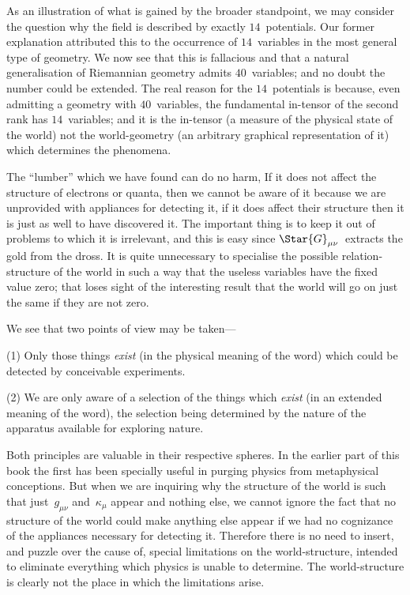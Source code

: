 \documentclass[12pt]{book}
\begin{document}
As an illustration of what is gained by the broader standpoint, we may
consider the question why the field is described by exactly $14$~potentials.
Our former explanation attributed this to the occurrence of $14$~variables in
the most general type of geometry. We now see that this is fallacious and
that a natural generalisation of Riemannian geometry admits $40$~variables;
and no doubt the number could be extended. The real reason for the $14$~potentials
is because, even admitting a geometry with $40$~variables, the
fundamental in\hyp{}tensor of the second rank has $14$~variables; and it is the
in\hyp{}tensor (a measure of the physical state of the world) not the world\hyp{}geometry
(an arbitrary graphical representation of it) which determines the phenomena.

The ``lumber'' which we have found can do no harm, If it does not affect
the structure of electrons or quanta, then we cannot be aware of it because
we are unprovided with appliances for detecting it, if it does affect their
structure then it is just as well to have discovered it. The important thing
is to keep it out of problems to which it is irrelevant, and this is easy since
$\Star{G}_{\mu\nu}$~extracts the gold from the dross. It is quite unnecessary to specialise
the possible relation\hyp{}structure of the world in such a way that the useless
variables have the fixed value zero; that loses sight of the interesting result
that the world will go on just the same if they are not zero.

We see that two points of view may be taken---

(1) Only those things \emph{exist} (in the physical meaning of the word) which
could be detected by conceivable experiments.

(2) We are only aware of a selection of the things which \emph{exist} (in an
extended meaning of the word), the selection being determined by the nature
of the apparatus available for exploring nature.

Both principles are valuable in their respective spheres. In the earlier
part of this book the first has been specially useful in purging physics from
metaphysical conceptions. But when we are inquiring why the structure of
the world is such that just~$g_{\mu\nu}$ and~$\kappa_{\mu}$ appear and nothing else, we cannot
ignore the fact that no structure of the world could make anything else
appear if we had no cognizance of the appliances necessary for detecting it.
Therefore there is no need to insert, and puzzle over the cause of, special
limitations on the world\hyp{}structure, intended to eliminate everything which
physics is unable to determine. The world\hyp{}structure is clearly not the place
in which the limitations arise.
\end{document}
